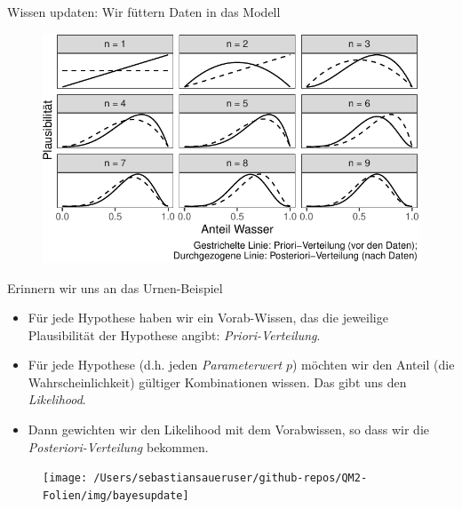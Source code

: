 \documentclass[
  ngerman,
  ignorenonframetext,
]{beamer}
\begin{document}
\begin{frame}{Wissen updaten: Wir füttern Daten in das Modell}
\protect\hypertarget{wissen-updaten-wir-fuxfcttern-daten-in-das-modell}{}
\begin{figure}[H]
\includegraphics[width=1\linewidth]{unnamed-chunk-19-1} \end{figure}
\end{frame}

\begin{frame}{Erinnern wir uns an das Urnen-Beispiel}
\protect\hypertarget{erinnern-wir-uns-an-das-urnen-beispiel}{}
\begin{itemize}
\item
  Für jede Hypothese haben wir ein Vorab-Wissen, das die jeweilige
  Plausibilität der Hypothese angibt: \emph{Priori-Verteilung}.
\item
  Für jede Hypothese (d.h. jeden \emph{Parameterwert} \(p\)) möchten wir
  den Anteil (die Wahrscheinlichkeit) gültiger Kombinationen wissen. Das
  gibt uns den \emph{Likelihood}.
\item
  Dann gewichten wir den Likelihood mit dem Vorabwissen, so dass wir die
  \emph{Posteriori-Verteilung} bekommen.
\end{itemize}

\begin{figure}[H]
\texttt{[image: /Users/sebastiansaueruser/github-repos/QM2-Folien/img/bayesupdate]} \end{figure}
\end{frame}

\end{document}
